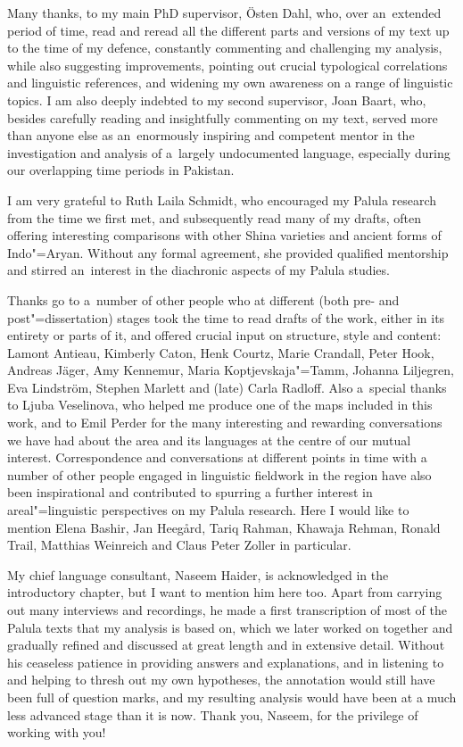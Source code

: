 \begin{refsection}
Many thanks, to my main PhD supervisor, Östen Dahl, who, over
an~extended period of time, read and reread all the different parts and versions of my text up to the time of my defence, constantly commenting and challenging my analysis, while also suggesting improvements, pointing out crucial typological correlations and linguistic references, and widening my own awareness on a range of linguistic topics. I am also deeply indebted to my second supervisor, Joan Baart, who,
besides carefully reading and insightfully commenting on my text, served more than anyone else as an~enormously inspiring and competent mentor in the investigation and analysis of a~largely undocumented language, especially during our overlapping time periods in Pakistan.


I am very grateful to Ruth Laila Schmidt, who encouraged my Palula research from the time we first met, and subsequently read many of my drafts, often offering interesting comparisons with other Shina varieties and ancient forms of Indo"=Aryan. Without any formal agreement, she
provided qualified mentorship and stirred an~interest in the diachronic aspects of my Palula studies.


Thanks go to a~number of other people who at different (both pre- and post"=dissertation) stages took the time to read drafts of the work, either in its entirety or parts of it, and offered crucial input on structure, style and content: Lamont Antieau, Kimberly Caton, Henk Courtz, Marie Crandall, Peter Hook, Andreas Jäger, Amy Kennemur, Maria Koptjevskaja"=Tamm, Johanna Liljegren, Eva Lindström, Stephen Marlett and (late) Carla Radloff. Also a~special thanks to Ljuba Veselinova, who helped me produce one of the maps included in this work, and to Emil Perder for the many interesting and rewarding conversations we have had about
the area and its languages at the centre of our mutual interest. Correspondence and conversations at different points in time with a number of other people engaged in linguistic fieldwork in the region have also been inspirational and contributed to spurring a further interest in areal"=linguistic perspectives on my Palula research. Here I would like to mention Elena Bashir, Jan Heegård, Tariq Rahman, Khawaja Rehman, Ronald Trail, Matthias Weinreich and Claus Peter Zoller in particular.


My chief language consultant, Naseem Haider, is acknowledged in the introductory chapter, but I want to mention him here too. Apart from carrying out many interviews and recordings, he made a first transcription of most of the Palula texts that my analysis is based on, which we later worked on together and gradually refined and discussed at great length and in extensive detail. Without his ceaseless patience in providing answers and explanations, and in listening to and helping to thresh out my own hypotheses, the annotation would still have been full of question marks, and my resulting analysis would have been at a much less advanced stage than it is now. Thank you, Naseem, for the privilege of working with you!



\end{refsection}
